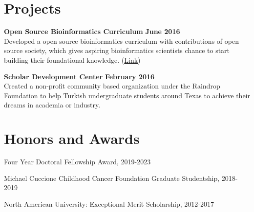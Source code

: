 \documentclass[margin,line]{res}
\begin{document}
\begin{resume}
%

%



\section{\sc Projects}


{\bf Open Source Bioinformatics Curriculum} \hfill {\bf June  2016}\\
Developed a open source bioinformatics curriculum with contributions of open source society, which gives aspiring bioinformatics scientists chance to start building their foundational knowledge. (\href{https://github.com/open-source-society/bioinformatics}{Link})

{\bf Scholar Development Center} \hfill {\bf February  2016}\\
Created a non-profit community based organization under the Raindrop Foundation to help Turkish undergraduate students around Texas to achieve their dreams in academia or industry.

\vspace{\baselineskip}

\section{\sc Honors and Awards}

Four Year Doctoral Fellowship Award, 2019-2023

\vspace*{-2.5mm}

Michael Cuccione Childhood Cancer Foundation Graduate Studentship, 2018-2019

\vspace*{-2.5mm}
North American University: Exceptional Merit Scholarship, 2012-2017


\end{resume}
\end{document}
